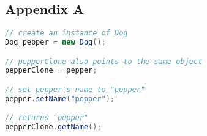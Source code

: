 \subsection*{Appendix A} \label{App:AppendixA}
\begin{lstlisting}[language=Java]
// create an instance of Dog
Dog pepper = new Dog();

// pepperClone also points to the same object
pepperClone = pepper;

// set pepper's name to "pepper"
pepper.setName("pepper");

// returns "pepper"
pepperClone.getName();

\end{lstlisting}
